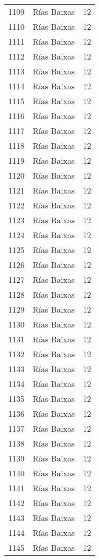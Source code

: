 \begin{table}[p]
\begin{tabular}{rlr}
  1109 & Rías Baixas &  12 \\ 
  1110 & Rías Baixas &  12 \\ 
  1111 & Rías Baixas &  12 \\ 
  1112 & Rías Baixas &  12 \\ 
  1113 & Rías Baixas &  12 \\ 
  1114 & Rías Baixas &  12 \\ 
  1115 & Rías Baixas &  12 \\ 
  1116 & Rías Baixas &  12 \\ 
  1117 & Rías Baixas &  12 \\ 
  1118 & Rías Baixas &  12 \\ 
  1119 & Rías Baixas &  12 \\ 
  1120 & Rías Baixas &  12 \\ 
  1121 & Rías Baixas &  12 \\ 
  1122 & Rías Baixas &  12 \\ 
  1123 & Rías Baixas &  12 \\ 
  1124 & Rías Baixas &  12 \\ 
  1125 & Rías Baixas &  12 \\ 
  1126 & Rías Baixas &  12 \\ 
  1127 & Rías Baixas &  12 \\ 
  1128 & Rías Baixas &  12 \\ 
  1129 & Rías Baixas &  12 \\ 
  1130 & Rías Baixas &  12 \\ 
  1131 & Rías Baixas &  12 \\ 
  1132 & Rías Baixas &  12 \\ 
  1133 & Rías Baixas &  12 \\ 
  1134 & Rías Baixas &  12 \\ 
  1135 & Rías Baixas &  12 \\ 
  1136 & Rías Baixas &  12 \\ 
  1137 & Rías Baixas &  12 \\ 
  1138 & Rías Baixas &  12 \\ 
  1139 & Rías Baixas &  12 \\ 
  1140 & Rías Baixas &  12 \\ 
  1141 & Rías Baixas &  12 \\ 
  1142 & Rías Baixas &  12 \\ 
  1143 & Rías Baixas &  12 \\ 
  1144 & Rías Baixas &  12 \\ 
  1145 & Rías Baixas &  12 \\ 

\end{tabular}
\end{table}
